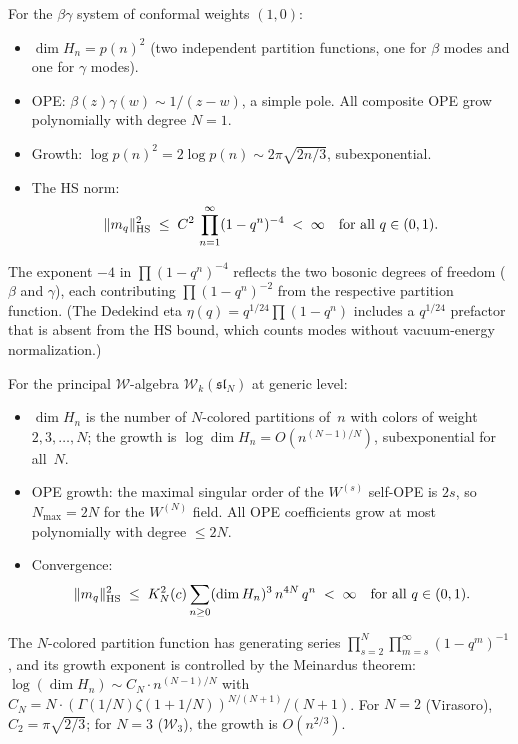 \begin{computation}
\label{comp:thqg-I-hs-betagamma}
For the $\beta\gamma$ system of conformal weights $(1,0)$:
\begin{itemize}
\item $\dim H_n = p(n)^2$ (two independent partition functions, one for $\beta$ modes and one for $\gamma$ modes).
\item OPE: $\beta(z)\gamma(w) \sim 1/(z-w)$, a simple pole. All composite OPE grow polynomially with degree $N = 1$.
\item Growth: $\log p(n)^2 = 2\log p(n) \sim 2\pi\sqrt{2n/3}$, subexponential.
\item The HS norm:
 \begin{equation}\label{eq:thqg-I-hs-betagamma-norm}
 \|m_q\|_{\operatorname{HS}}^2 \;\leq\; C^2\,\prod_{n=1}^\infty(1-q^n)^{-4} \;<\; \infty \quad\text{for all } q \in (0,1).
 \end{equation}
\end{itemize}
The exponent $-4$ in $\prod(1-q^n)^{-4}$ reflects the two bosonic degrees of freedom ($\beta$ and $\gamma$), each contributing $\prod(1-q^n)^{-2}$ from the respective partition function. (The Dedekind eta $\eta(q) = q^{1/24}\prod(1-q^n)$ includes a $q^{1/24}$ prefactor that is absent from the HS bound, which counts modes without vacuum-energy normalization.)
\end{computation}

\begin{computation}
\label{comp:thqg-I-hs-wn}
For the principal $\mathcal{W}$-algebra $\mathcal{W}_k(\mathfrak{sl}_N)$ at generic level:
\begin{itemize}
\item $\dim H_n$ is the number of $N$-colored partitions of~$n$ with colors of weight $2, 3, \ldots, N$; the growth is $\log \dim H_n = O(n^{(N-1)/N})$, subexponential for all~$N$.
\item OPE growth: the maximal singular order of the $W^{(s)}$ self-OPE is $2s$, so $N_{\max} = 2N$ for the $W^{(N)}$ field. All OPE coefficients grow at most polynomially with degree $\leq 2N$.
\item Convergence:
 \begin{equation}\label{eq:thqg-I-hs-wn-norm}
 \|m_q\|_{\operatorname{HS}}^2 \;\leq\; K_N^2(c) \sum_{n \geq 0} (\dim H_n)^3\,n^{4N}\,q^n \;<\; \infty \quad\text{for all } q \in (0,1).
 \end{equation}
\end{itemize}
The $N$-colored partition function has generating series $\prod_{s=2}^N \prod_{m=s}^\infty (1-q^m)^{-1}$, and its growth exponent is controlled by the Meinardus theorem: $\log(\dim H_n) \sim C_N \cdot n^{(N-1)/N}$ with $C_N = N \cdot (\Gamma(1/N) \zeta(1+1/N))^{N/(N+1)} / (N+1)$. For $N = 2$ (Virasoro), $C_2 = \pi\sqrt{2/3}$; for $N = 3$ ($\mathcal{W}_3$), the growth is $O(n^{2/3})$.
\end{computation}

